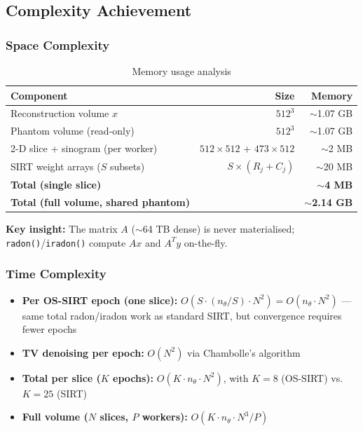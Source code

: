 \documentclass[11pt,a4paper]{article}
\begin{document}
\subsection{Complexity Achievement}

\subsubsection{Space Complexity}

\begin{table}[h]
\centering
\begin{tabular}{lrr}
\toprule
\textbf{Component} & \textbf{Size} & \textbf{Memory} \\
\midrule
Reconstruction volume $x$ & $512^3$ & $\sim$1.07 GB \\
Phantom volume (read-only) & $512^3$ & $\sim$1.07 GB \\
2-D slice + sinogram (per worker) & $512 \times 512$ + $473 \times 512$ & $\sim$2 MB \\
SIRT weight arrays ($S$ subsets) & $S \times (R_j + C_j)$ & $\sim$20 MB \\
\midrule
\textbf{Total (single slice)} & & $\sim$\textbf{4 MB} \\
\textbf{Total (full volume, shared phantom)} & & $\sim$\textbf{2.14 GB} \\
\bottomrule
\end{tabular}
\caption{Memory usage analysis}
\end{table}

\textbf{Key insight:} The matrix $A$ ($\sim$64 TB dense) is never materialised; \texttt{radon()}/\texttt{iradon()} compute $Ax$ and $A^T y$ on-the-fly.

\subsubsection{Time Complexity}

\begin{itemize}
    \item \textbf{Per OS-SIRT epoch (one slice):} $O(S \cdot (n_\theta / S) \cdot N^2) = O(n_\theta \cdot N^2)$ --- same total radon/iradon work as standard SIRT, but convergence requires fewer epochs
    \item \textbf{TV denoising per epoch:} $O(N^2)$ via Chambolle's algorithm
    \item \textbf{Total per slice ($K$ epochs):} $O(K \cdot n_\theta \cdot N^2)$, with $K = 8$ (OS-SIRT) vs.\ $K = 25$ (SIRT)
    \item \textbf{Full volume ($N$ slices, $P$ workers):} $O(K \cdot n_\theta \cdot N^3 / P)$
\end{itemize}
\end{document}
